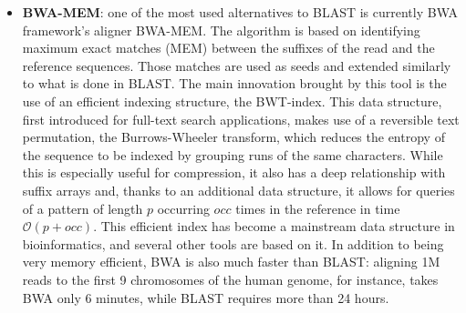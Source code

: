 \begin{itemize}
    \item \textbf{BWA-MEM}: one of the most used alternatives to BLAST is currently BWA framework's aligner BWA-MEM. The algorithm is based on identifying maximum exact matches (MEM) between the suffixes of the read and the reference sequences. Those matches are used as seeds and extended similarly to what is done in BLAST. The main innovation brought by this tool is the use of an efficient indexing structure, the BWT-index. This data structure, first introduced for full-text search applications, makes use of a reversible text permutation, the Burrows-Wheeler transform, which reduces the entropy of the sequence to be indexed by grouping runs of the same characters. While this is especially useful for compression, it also has a deep relationship with suffix arrays and, thanks to an additional data structure, it allows for queries of a pattern of length $p$ occurring $occ$ times in the reference in time $\mathcal{O}(p+occ)$. This efficient index has become a mainstream data structure in bioinformatics, and several other tools are based on it. In addition to being very memory efficient, BWA is also much faster than BLAST: aligning 1M reads to the first 9 chromosomes of the human genome, for instance, takes BWA only 6 minutes, while BLAST requires more than 24 hours.
\end{itemize}
